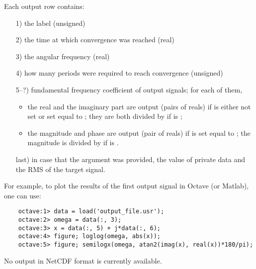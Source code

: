 Each output row contains:
\begin{itemize}
\item[1)] the label (unsigned)
\item[2)] the time at which convergence was reached (real)
\item[3)] the angular frequency (real)
\item[4)] how many periods were required to reach convergence (unsigned)
\item[5--?)] fundamental frequency coefficient of output signals; for each of them, 
\begin{itemize}
	\item the real and the imaginary part are output (pairs of reals) 
	if  is either not set or set equal to ;
	they are both divided by 	if  is ;
	\item the magnitude and phase are output (pair of reals)
	if  is set equal to ;
	the magnitude is divided by  if  is .
\end{itemize}
\item[last)] in case that the argument  was provided, the value of private data  and the RMS of the target signal.
\end{itemize}
For example, to plot the results of the first output signal in Octave (or Matlab), one can use:
\begin{framed}
\begin{verbatim}
    octave:1> data = load('output_file.usr');
    octave:2> omega = data(:, 3);
    octave:3> x = data(:, 5) + j*data(:, 6);
    octave:4> figure; loglog(omega, abs(x));
    octave:5> figure; semilogx(omega, atan2(imag(x), real(x))*180/pi);
\end{verbatim}
\end{framed}


No output in NetCDF format is currently available.

